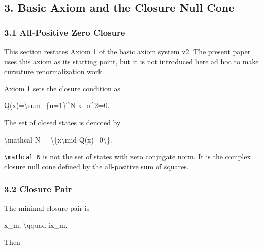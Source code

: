 \documentclass[
  a4paper,
]{article}
\newenvironment{Shaded}{}{}
\newcommand{\NormalTok}[1]{#1}
\begin{document}
\subsection{3. Basic Axiom and the Closure Null
Cone}\label{basic-axiom-and-the-closure-null-cone}

\subsubsection{3.1 All-Positive Zero
Closure}\label{all-positive-zero-closure}

This section restates Axiom 1 of the basic axiom system v2. The present
paper uses this axiom as its starting point, but it is not introduced
here ad hoc to make curvature renormalization work.

Axiom 1 sets the closure condition as

\begin{Shaded}
\begin{Highlighting}[]
\NormalTok{Q(x)=\textbackslash{}sum\_\{n=1\}\^{}N x\_n\^{}2=0.}
\end{Highlighting}
\end{Shaded}

The set of closed states is denoted by

\begin{Shaded}
\begin{Highlighting}[]
\NormalTok{\textbackslash{}mathcal N}
\NormalTok{=}
\NormalTok{\textbackslash{}\{x\textbackslash{}mid Q(x)=0\textbackslash{}\}.}
\end{Highlighting}
\end{Shaded}

\texttt{\textbackslash{}mathcal\ N} is not the set of states with zero
conjugate norm. It is the complex closure null cone defined by the
all-positive sum of squares.

\subsubsection{3.2 Closure Pair}\label{closure-pair}

The minimal closure pair is

\begin{Shaded}
\begin{Highlighting}[]
\NormalTok{x\_m,}
\NormalTok{\textbackslash{}qquad}
\NormalTok{ix\_m.}
\end{Highlighting}
\end{Shaded}

Then
\end{document}
